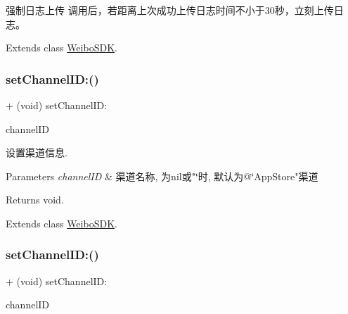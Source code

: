 强制日志上传 调用后，若距离上次成功上传日志时间不小于30秒，立刻上传日志。 

Extends class \mbox{\hyperlink{interface_weibo_s_d_k_ab5d6291270ebed0084a505e009bc15a2}{Weibo\+S\+DK}}.

\mbox{\label{category_weibo_s_d_k_07_statistics_08_a8d9fad53942642ec304ecba4734e05c1}} 
\subsubsection{\texorpdfstring{set\+Channel\+I\+D\+:()}{setChannelID:()}\hspace{0.1cm}{\footnotesize\ttfamily [1/3]}}
{\footnotesize\ttfamily + (void) set\+Channel\+I\+D\+: \begin{DoxyParamCaption}\item[{(N\+S\+String $\ast$)}]{channel\+ID }\end{DoxyParamCaption}}

设置渠道信息. 
\begin{DoxyParams}{Parameters}
{\em channel\+ID} & 渠道名称, 为nil或"\char`\"{}时, 默认为@\char`\"{}App\+Store"渠道 \\
\hline
\end{DoxyParams}
\begin{DoxyReturn}{Returns}
void. 
\end{DoxyReturn}


Extends class \mbox{\hyperlink{interface_weibo_s_d_k_a8d9fad53942642ec304ecba4734e05c1}{Weibo\+S\+DK}}.

\mbox{\label{category_weibo_s_d_k_07_statistics_08_a8d9fad53942642ec304ecba4734e05c1}} 
\subsubsection{\texorpdfstring{set\+Channel\+I\+D\+:()}{setChannelID:()}\hspace{0.1cm}{\footnotesize\ttfamily [2/3]}}
{\footnotesize\ttfamily + (void) set\+Channel\+I\+D\+: \begin{DoxyParamCaption}\item[{(N\+S\+String $\ast$)}]{channel\+ID }\end{DoxyParamCaption}}

